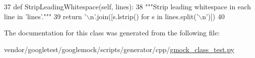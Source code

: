 \begin{DoxyCode}
37   \textcolor{keyword}{def }StripLeadingWhitespace(self, lines):
38     \textcolor{stringliteral}{"""Strip leading whitespace in each line in 'lines'."""}
39     \textcolor{keywordflow}{return} \textcolor{stringliteral}{'\(\backslash\)n'}.join([s.lstrip() \textcolor{keywordflow}{for} s \textcolor{keywordflow}{in} lines.split(\textcolor{stringliteral}{'\(\backslash\)n'})])
40 
\end{DoxyCode}


The documentation for this class was generated from the following file\+:\begin{DoxyCompactItemize}
\item 
vendor/googletest/googlemock/scripts/generator/cpp/\hyperlink{gmock__class__test_8py}{gmock\+\_\+class\+\_\+test.\+py}\end{DoxyCompactItemize}
